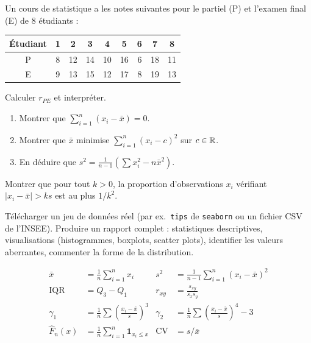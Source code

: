 \begin{exercice}
Un cours de statistique a les notes suivantes pour le partiel (P) et l'examen final (E) de 8 \'etudiants :
\begin{center}
\begin{tabular}{ccccccccc}
\toprule
\'Etudiant & 1 & 2 & 3 & 4 & 5 & 6 & 7 & 8 \\
\midrule
P & 8 & 12 & 14 & 10 & 16 & 6 & 18 & 11 \\
E & 9 & 13 & 15 & 12 & 17 & 8 & 19 & 13 \\
\bottomrule
\end{tabular}
\end{center}
Calculer $r_{PE}$ et interpr\'eter.
\end{exercice}

\begin{exercice}
\begin{enumerate}
\item Montrer que $\sum_{i=1}^n (x_i - \bar{x}) = 0$.
\item Montrer que $\bar{x}$ minimise $\sum_{i=1}^n (x_i - c)^2$ sur $c\in\mathbb{R}$.
\item En d\'eduire que $s^2 = \frac{1}{n-1}\left(\sum x_i^2 - n\bar{x}^2\right)$.
\end{enumerate}
\end{exercice}

\begin{exercice}
Montrer que pour tout $k>0$, la proportion d'observations $x_i$ v\'erifiant $|x_i-\bar{x}|>ks$ est au plus $1/k^2$.
\end{exercice}

\begin{exercice}
T\'el\'echarger un jeu de donn\'ees r\'eel (par ex.\ \texttt{tips} de \texttt{seaborn} ou un fichier CSV de l'INSEE). Produire un rapport complet : statistiques descriptives, visualisations (histogrammes, boxplots, scatter plots), identifier les valeurs aberrantes, commenter la forme de la distribution.
\end{exercice}

\begin{formules}
\begin{align*}
\bar{x} &= \frac{1}{n}\sum_{i=1}^n x_i &
s^2 &= \frac{1}{n-1}\sum_{i=1}^n(x_i-\bar{x})^2 \\
\mathrm{IQR} &= Q_3 - Q_1 &
r_{xy} &= \frac{s_{xy}}{s_x s_y} \\
\gamma_1 &= \frac{1}{n}\sum\left(\frac{x_i-\bar{x}}{s}\right)^3 &
\gamma_2 &= \frac{1}{n}\sum\left(\frac{x_i-\bar{x}}{s}\right)^4-3 \\
\hat{F}_n(x) &= \frac{1}{n}\sum_{i=1}^n \mathbf{1}_{x_i\leq x} &
\mathrm{CV} &= s/\bar{x}
\end{align*}
\end{formules}
